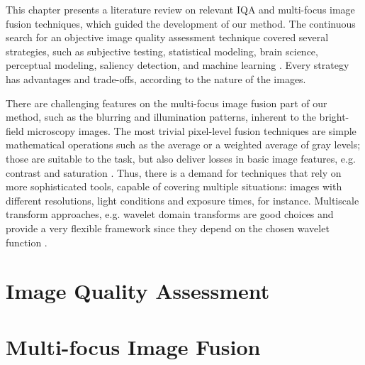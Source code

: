 This chapter presents a literature review on relevant IQA and multi-focus image fusion techniques, which guided the development of our method. The continuous search for an objective image quality assessment technique covered several strategies, such as subjective testing, statistical modeling, brain science, perceptual modeling, saliency detection, and machine learning \cite{tang2019feature}. Every strategy has advantages and trade-offs, according to the nature of the images. 

There are challenging features on the multi-focus image fusion part of our method, such as the blurring and illumination patterns, inherent to the bright-field microscopy images. The most trivial pixel-level fusion techniques are simple mathematical operations such as the average or a weighted average of gray levels; those are suitable to the task, but also deliver losses in basic image features, e.g. contrast and saturation \cite{zhang2009multifocus}. Thus, there is a demand for techniques that rely on more sophisticated tools, capable of covering multiple situations: images with different resolutions, light conditions and exposure times, for instance. Multiscale transform approaches, e.g. wavelet domain transforms are good choices and provide a very flexible framework since they depend on the chosen wavelet function \cite{pajares2004wavelet}. 

\section{Image Quality Assessment}


\section{Multi-focus Image Fusion}
